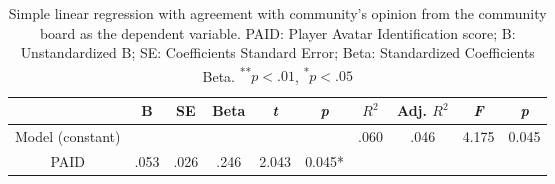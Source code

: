 \begin{table}
  \caption{Simple linear regression with agreement with community's opinion from the community board as the dependent variable.
  PAID: Player Avatar Identification score; B: Unstandardized B; SE: Coefficients Standard Error; Beta: Standardized Coefficients Beta.
  \textsuperscript{**}$p<.01$, 
  \textsuperscript{*}$p<.05$} 
  \label{tab:comm_opini}
 \begin{tabular}{cccccccccc}
    \toprule
    &B&SE&Beta&\textit{t}&\textit{p}&$R^{2}$&Adj. $R^{2}$&\textit{F}&\textit{p}\\ %
    \midrule                                  
     Model (constant)& &  & &  & &.060&.046&4.175&0.045\\
     PAID&.053 &.026  &.246 &2.043   &0.045*&&&&\\
    \bottomrule
 \end{tabular}
\end{table}



